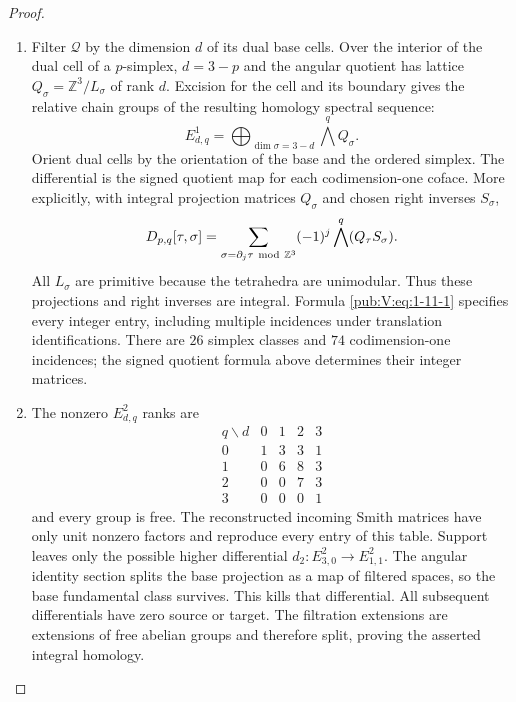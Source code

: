 \documentclass[11pt,a4paper]{article}
\numberwithin{equation}{section}
\theoremstyle{definition}
\begin{document}
\begin{proof}
\begin{enumerate}[label=\arabic*.]
The polar maps agree under the integral monomial overlaps.
At $C(q)=0$ the deck multipliers have positive real values, so the
logarithmic fibre at angle one is the product of the base and angular
three-tori in item~3, with their given markings.

The mapping-cylinder comparison for a proper vertical log-smooth
family identifies this logarithmic forgetful map with the nearby-fibre collapse, compatibly with the central strata
\cite[formula (3-3-1), p.~478; Theorem 4.1.1 and Lemmas
4.1.2--4.1.3, pp.~480--482]{ffAchingerOgus20}.
Its angular cycles are $a_j$ and its base cycles are $b_j$.
In these column-basis conventions monodromy fixes each $a_j$
and sends $b_j$ to $b_j+a_j$, as specified by $Nb_j=a_j$.
The stratified deformation in item~1 transports this map
back to the original bounded period matrix.

\item Filter $\mathcal Q$ by the dimension $d$ of its dual base cells.
Over the interior of the dual cell of a $p$-simplex, $d=3-p$ and the
angular quotient has lattice
$Q_\sigma=\mathbb Z^3/L_\sigma$ of rank $d$.
Excision for the cell and its boundary gives the relative chain
groups of the resulting homology spectral sequence:
\[
E^1_{d,q}=\bigoplus_{\dim\sigma=3-d}\bigwedge^qQ_\sigma.
\]
Orient dual cells by the orientation of the base and the ordered
simplex.  The differential is the signed quotient map for each
codimension-one coface.  More explicitly, with integral projection
matrices $Q_\sigma$ and chosen right inverses $S_\sigma$,
\begin{equation}
D_{p,q}[\tau,\sigma]=
 \sum_{\sigma=\partial_j\tau\ {\rm mod}\ \mathbb Z^3}
 (-1)^j\bigwedge^q(Q_\tau S_\sigma).
\label{pub:V:eq:1-11-1}
\end{equation}
All $L_\sigma$ are primitive because the tetrahedra are unimodular.
Thus these projections and right inverses are integral.  Formula
\eqref{pub:V:eq:1-11-1} specifies every integer entry, including multiple incidences
under translation identifications. There are $26$ simplex classes and $74$ codimension-one incidences;
the signed quotient formula above determines their integer matrices.

\item The nonzero $E^2_{d,q}$ ranks are
\[
\begin{array}{c|rrrr}
q\backslash d&0&1&2&3\\\hline
0&1&3&3&1\\
1&0&6&8&3\\
2&0&0&7&3\\
3&0&0&0&1
\end{array}
\]
and every group is free. The reconstructed incoming Smith matrices
have only unit nonzero factors and reproduce every entry of this table.
Support leaves only the possible higher differential
$d_2:E^2_{3,0}\to E^2_{1,1}$.
The angular identity section splits the base projection as a map of
filtered spaces, so the base fundamental class survives.  This kills
that differential.  All subsequent differentials have zero source or
target.  The filtration extensions are extensions of free abelian
groups and therefore split, proving the asserted integral homology.


\end{enumerate}
\end{proof}
\end{document}
